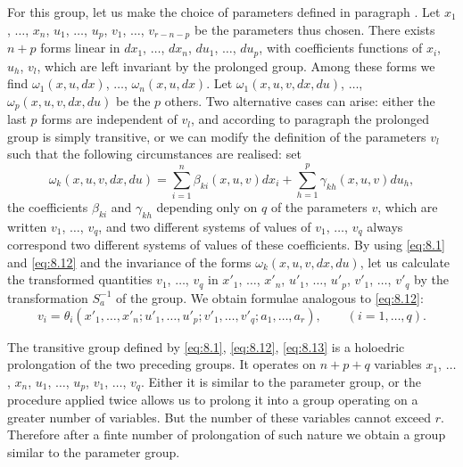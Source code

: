 For this group, let us make the choice of parameters defined in paragraph . Let $x_{1}$, $\dots$, $x_{n}$, $u_{1}$, $\dots$, $u_{p}$, $v_{1}$, $\dots$, $v_{r-n-p}$ be the parameters thus chosen. There exists $n+p$ forms linear in $dx_{1}$, $\dots$, $dx_{n}$, $du_{1}$, $\dots$, $du_{p}$, with coefficients functions of $x_{i}$, $u_{h}$, $v_{l}$, which are left invariant by the prolonged group. Among these forms we find $\omega_{1}(x,u,dx)$, $\dots$, $\omega_{n}(x,u,dx)$. Let $\omega_{1}(x,u,v,dx,du)$, $\dots$, $\omega_{p}(x,u,v,dx,du)$ be the $p$ others. Two alternative cases can arise: either the last $p$ forms are independent of $v_{l}$, and according to paragraph  the prolonged group is simply transitive, or we can modify the definition of the parameters $v_{l}$ such that the following circumstances are realised: set
\[
\omega_{k}(x,u,v,dx,du)=\sum_{i=1}^{n}\beta_{ki}(x,u,v)dx_{i}+\sum_{h=1}^{p}\gamma_{kh}(x,u,v)du_{h},
\]
the coefficients $\beta_{ki}$ and $\gamma_{kh}$ depending only on $q$ of the parameters $v$, which are written $v_{1}$, $\dots$, $v_{q}$, and two different systems of values of $v_{1}$, $\dots$, $v_{q}$ always correspond two different systems of values of these coefficients. By using \eqref{eq:8.1} and \eqref{eq:8.12} and the invariance of the forms $\omega_{k}(x,u,v,dx,du)$, let us calculate the transformed quantities $v_{1}$, $\dots$, $v_{q}$ in $x'_{1}$, $\dots$, $x'_{n}$, $u'_{1}$, $\dots$, $u'_{p}$, $v'_{1}$, $\dots$, $v'_{q}$ by the transformation $S^{-1}_{a}$ of the group. We obtain formulae analogous to \eqref{eq:8.12}:
\begin{equation}
  \label{eq:8.13}
  v_{i}=\theta_{i}(x'_{1}, \dots, x'_{n};u'_{1}, \dots, u'_{p};v'_{1}, \dots, v'_{q};a_{1},\dots,a_{r}),\qquad (i=1,\dots,q).
\end{equation}

The transitive group defined by \eqref{eq:8.1}, \eqref{eq:8.12}, \eqref{eq:8.13} is a holoedric prolongation of the two preceding groups. It operates on $n+p+q$ variables $x_{1}$, $\dots$, $x_{n}$, $u_{1}$, $\dots$, $u_{p}$, $v_{1}$, $\dots$, $v_{q}$. Either it is similar to the parameter group, or the procedure applied twice allows us to prolong it into a group operating on a greater number of variables. But the number of these variables cannot exceed $r$. Therefore after a finte number of prolongation of such nature we obtain a group similar to the parameter group.

\somespace

